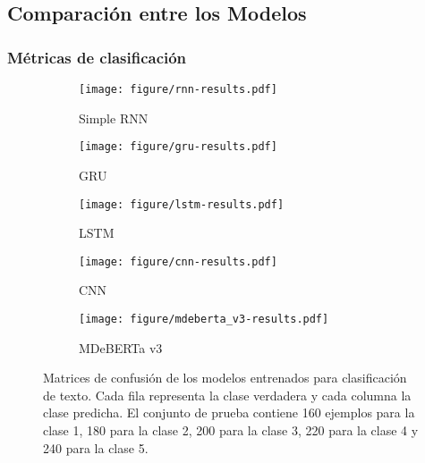 \documentclass[paper=letter, fontsize=11pt, draft=false]{scrartcl}
\numberwithin{equation}{section} %
\numberwithin{figure}{section} %
\numberwithin{table}{section} %
\numberwithin{subsection}{section}
\begin{document}
\newpage

\subsection{Comparación entre los Modelos}

\subsubsection{Métricas de clasificación}

\begin{figure}[H]
    \centering
    \begin{subfigure}[b]{0.32\textwidth}
        \texttt{[image: figure/rnn-results.pdf]}
        \caption{Simple RNN}
        \label{fig:rnn_cm}
    \end{subfigure}
    \hfill
    \begin{subfigure}[b]{0.32\textwidth}
        \texttt{[image: figure/gru-results.pdf]}
        \caption{GRU}
        \label{fig:gru_cm}
    \end{subfigure}
    \hfill
    \begin{subfigure}[b]{0.32\textwidth}
        \texttt{[image: figure/lstm-results.pdf]}
        \caption{LSTM}
        \label{fig:lstm_cm}
    \end{subfigure}

    \vspace{1em} %


    \begin{subfigure}[b]{0.32\textwidth}
        \texttt{[image: figure/cnn-results.pdf]}
        \caption{CNN}
        \label{fig:cnn_cm}
    \end{subfigure}
    \hspace{1cm}
    \begin{subfigure}[b]{0.32\textwidth}
        \texttt{[image: figure/mdeberta\_v3-results.pdf]}
        \caption{MDeBERTa v3}
        \label{fig:mdeberta_cm}
    \end{subfigure}

    \caption{Matrices de confusión de los modelos entrenados para clasificación de texto. Cada fila representa la clase verdadera y cada columna la clase predicha. El conjunto de prueba contiene 160 ejemplos para la clase 1, 180 para la clase 2, 200 para la clase 3, 220 para la clase 4 y 240 para la clase 5.}
    \label{fig:cms}
\end{figure}
\end{document}
